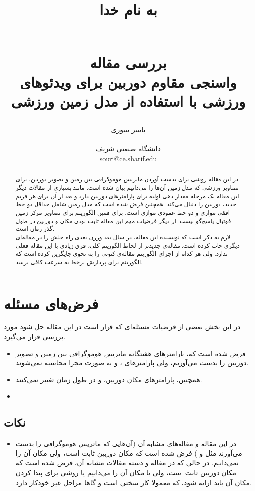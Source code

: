 \documentclass{report}
\title{
\begin{normalsize}
به نام خدا
\end{normalsize}
\\[2cm]
بررسی مقاله
\\[1cm]
واسنجی مقاوم دوربین برای ویدئوهای ورزشی با استفاده از مدل زمین ورزشی
}
\author{یاسر سوری
\\
\\ \small دانشگاه صنعتی شریف
\\ \small souri@ce.sharif.edu
}
\begin{document}
\maketitle

\begin{abstract}
در این مقاله روشی برای بدست آوردن ماتریس هوموگرافی بین زمین و تصویر دوربین، برای تصاویر ورزشی که مدل زمین آن‌ها را می‌دانیم بیان شده است. مانند بسیاری از مقالات دیگر این مقاله یک مرحله مقدار دهی اولیه برای پارامترهای دوربین دارد و بعد از آن برای هر فریم جدید، دوربین را دنبال  می‌کند. همچنین فرض شده است که مدل زمین شامل حداقل دو خط افقی موازی و دو خط عمودی موازی است. برای همین الگوریتم برای تصاویر مرکز زمین فوتبال پاسخ‌گو نیست. از دیگر فرضیات مهم این مقاله ثابت بودن مکان و  دوربین در طول گذر زمان است.
\\
لازم به ذکر است که نویسنده این مقاله، در سال بعد ورژن بعدی راه حلش را در مقاله‌ای دیگری چاپ کرده است\cite{new_paper}. مقاله‌ی جدیدتر از لحاظ الگوریتم کلی، فرق زیادی با این مقاله فعلی ندارد. ولی هر کدام از اجزای الگوریتم مقاله‌ی کنونی را به نحوی جایگزین کرده است که الگوریتم برای پردازش برخط به سرعت کافی برسد.

\end{abstract}

\section{فرض‌های مسئله}
در این بخش بعضی از فرضیات مسئله‌ای که قرار است در این مقاله حل شود مورد بررسی قرار می‌گیرد.
\begin{itemize}
\item
فرض شده است که، پارامتر‌های هشتگانه ماتریس هوموگرافی بین زمین و تصویر دوربین را بدست می‌آوریم، ولی پارامترهای ،  و  به صورت مجزا محاسبه نمی‌شوند.
\item
همچنین، پارامترهای مکان دوربین،  و  در طول زمان تغییر نمی‌کنند.
\item

\end{itemize}
\subsection{نکات}
\begin{itemize}
\item
در این مقاله و مقاله‌های مشابه آن (آن‌هایی که ماتریس هوموگرافی را بدست می‌آورند مثل \cite{new_paper} و \cite{tunesiha}) فرض شده است که مکان دوربین ثابت است، ولی مکان آن را نمی‌دانیم. در حالی که در مقاله \cite{thomas.2007}و دسته‌ مقالات مشابه آن، فرض شده است که مکان دوربین ثابت است، ولی یا مکان آن را می‌دانیم یا روشی برای پیدا کردن مکان آن باید ارائه شود، که معمولا کار سختی است و گاها مراحل غیر خودکار دارد.
\end{itemize}
\end{document}
